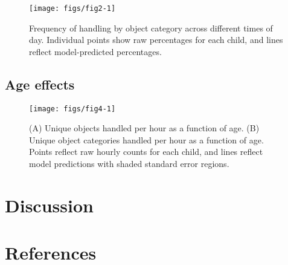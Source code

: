 \documentclass[10pt, letterpaper]{article}
\newenvironment{CodeChunk}{}{}
\begin{document}
\begin{CodeChunk}
\begin{figure}[h]

{\centering \texttt{[image: figs/fig2-1]} 

}

\caption[Frequency of handling by object category across different times of day]{Frequency of handling by object category across different times of day. Individual points show raw percentages for each child, and lines reflect model-predicted percentages.}\label{fig:fig2}
\end{figure}
\end{CodeChunk}

\hypertarget{age-effects}{%
\subsection{Age effects}\label{age-effects}}

\begin{CodeChunk}
\begin{figure}[h]

{\centering \texttt{[image: figs/fig4-1]} 

}

\caption[(A) Unique objects handled per hour as a function of age]{(A) Unique objects handled per hour as a function of age. (B) Unique object categories handled per hour as a function of age. Points reflect raw hourly counts for each child, and lines reflect model predictions with shaded standard error regions.}\label{fig:fig4}
\end{figure}
\end{CodeChunk}

\hypertarget{discussion}{%
\section{Discussion}\label{discussion}}

\hypertarget{references}{%
\section{References}\label{references}}

\setlength{\parindent}{-0.1in} 
\setlength{\leftskip}{0.125in}

\noindent


\end{document}
